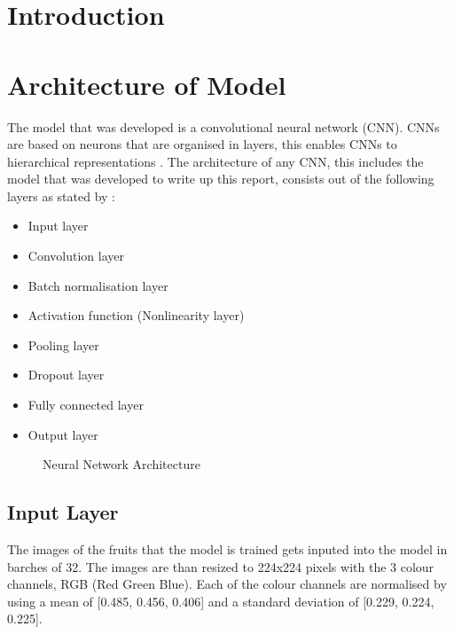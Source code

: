\documentclass[a4paper,oneside,11pt]{book}
\begin{document}
\MakeTitle 
{} 
\tableofcontents
\cleardoublepage
\setcounter{page}{2}
\listoffigures
\cleardoublepage 
{} 

\pagestyle{plain}
\chapter[Introduction]{Introduction}



\chapter[Architecture of Model]{Architecture of Model}

The model that was developed is a convolutional neural network (CNN). CNNs are based on neurons that are organised in layers, this enables CNNs to hierarchical representations \citep{kattenborn2021review}. The architecture of any CNN, this includes the model that was developed to write up this report, consists out of the following layers as stated by \cite{bhatt2021cnn}: 
\begin{itemize}
    \item Input layer
    \item Convolution layer
    \item Batch normalisation layer
    \item Activation function (Nonlinearity layer)
    \item Pooling layer
    \item Dropout layer
    \item Fully connected layer
    \item Output layer
\end{itemize}

\begin{figure}[h]
    \centering
    \caption{Neural Network Architecture}
\end{figure}

\newpage
\section{Input Layer}

The images of the fruits that the model is trained gets inputed into the model in barches of 32. The images are than resized to 224x224 pixels with the 3 colour channels, RGB (Red Green Blue). Each of the colour channels are normalised by using a mean of [0.485, 0.456, 0.406] and a standard deviation of [0.229, 0.224, 0.225]. 
\end{document}
